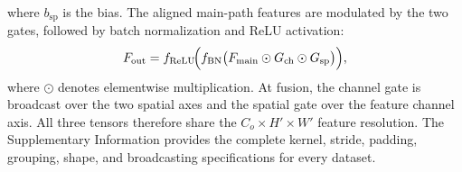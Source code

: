 ﻿\documentclass{nsr}
\begin{document}
where $b_{\mathrm{sp}}$ is the bias. The aligned main-path features are modulated by the two gates, followed by batch normalization and ReLU activation:
\begin{equation}
F_{\mathrm{out}} = f_{\mathrm{ReLU}}\!\Bigl(f_{\mathrm{BN}}\bigl(F_{\mathrm{main}}\odot G_{\mathrm{ch}}\odot G_{\mathrm{sp}}\bigr)\Bigr),
\label{eq:dsgm_out}
\end{equation}
where $\odot$ denotes elementwise multiplication. At fusion, the channel gate is broadcast over the two spatial axes and the spatial gate over the feature channel axis. All three tensors therefore share the $C_o\times H'\times W'$ feature resolution. The Supplementary Information provides the complete kernel, stride, padding, grouping, shape, and broadcasting specifications for every dataset.

\begin{table}[t]
\centering
\hspace*{-2.8cm}
\begin{minipage}{1.2\textwidth}
\caption{Performance Comparison with Classical Machine Learning and Lightweight Deep Learning Models}
\label{tab:overall_15models}
\setlength{\tabcolsep}{2.5pt}
\renewcommand{\arraystretch}{1.3}
\footnotesize
{}
\end{minipage}
\end{table}
\end{document}
